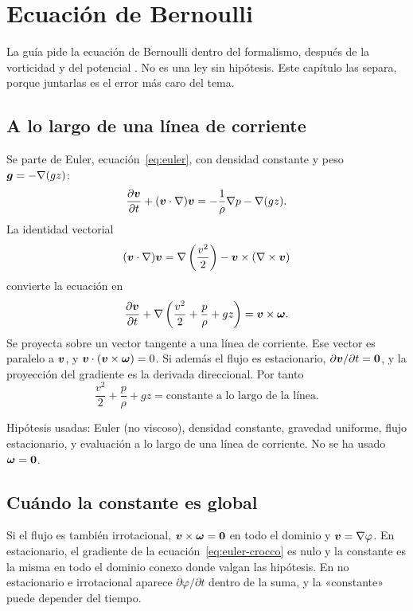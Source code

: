 \chapter{Ecuación de Bernoulli}
\label{ch:bernoulli}

La guía pide la ecuación de Bernoulli dentro del formalismo, después de la vorticidad y del potencial \parencite{uleGuia2026}. No es una ley sin hipótesis. Este capítulo las separa, porque juntarlas es el error más caro del tema.

\section{A lo largo de una línea de corriente}

Se parte de Euler, ecuación~\eqref{eq:euler}, con densidad constante y peso \(\boldsymbol{g}=-\nabla(gz)\):
\[
\frac{\partial\boldsymbol{v}}{\partial t}+(\boldsymbol{v}\cdot\nabla)\boldsymbol{v}
=-\frac{1}{\rho}\nabla p-\nabla(gz).
\]
La identidad vectorial
\[
(\boldsymbol{v}\cdot\nabla)\boldsymbol{v}
=\nabla\left(\frac{v^2}{2}\right)-\boldsymbol{v}\times(\nabla\times\boldsymbol{v})
\]
convierte la ecuación en
\begin{equation}
\label{eq:euler-crocco}
\frac{\partial\boldsymbol{v}}{\partial t}
+\nabla\left(\frac{v^2}{2}+\frac{p}{\rho}+gz\right)
=\boldsymbol{v}\times\boldsymbol{\omega}.
\end{equation}
Se proyecta sobre un vector tangente a una línea de corriente. Ese vector es paralelo a \(\boldsymbol{v}\), y \(\boldsymbol{v}\cdot(\boldsymbol{v}\times\boldsymbol{\omega})=0\). Si además el flujo es estacionario, \(\partial\boldsymbol{v}/\partial t=\boldsymbol{0}\), y la proyección del gradiente es la derivada direccional. Por tanto
\begin{equation}
\label{eq:bernoulli}
\frac{v^2}{2}+\frac{p}{\rho}+gz
=\text{constante a lo largo de la línea}.
\end{equation}

Hipótesis usadas: Euler (no viscoso), densidad constante, gravedad uniforme, flujo estacionario, y evaluación a lo largo de una línea de corriente. No se ha usado \(\boldsymbol{\omega}=\boldsymbol{0}\).

\section{Cuándo la constante es global}

Si el flujo es también irrotacional, \(\boldsymbol{v}\times\boldsymbol{\omega}=\boldsymbol{0}\) en todo el dominio y \(\boldsymbol{v}=\nabla\varphi\). En estacionario, el gradiente de la ecuación~\eqref{eq:euler-crocco} es nulo y la constante es la misma en todo el dominio conexo donde valgan las hipótesis. En no estacionario e irrotacional aparece \(\partial\varphi/\partial t\) dentro de la suma, y la «constante» puede depender del tiempo.

